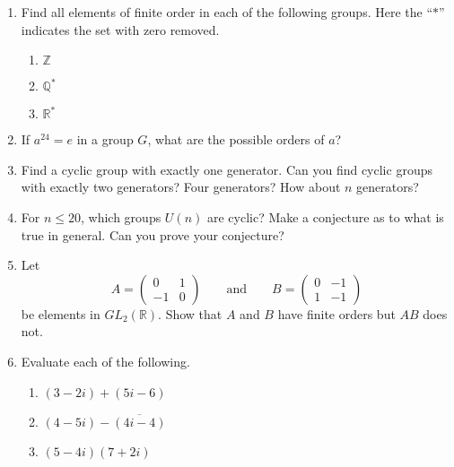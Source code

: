 {\begin{enumerate}
\item
Find all elements of finite order in each of the following groups. Here the ``$\ast$'' indicates the set with zero removed.
\begin{multicols}{3}
\begin{enumerate}
 
 \item
${\mathbb Z}$
 
 \item
${\mathbb Q}^\ast$
 
 \item
${\mathbb R}^\ast$
 
\end{enumerate}
 \end{multicols}
 
\item
If $a^{24} =e$ in a group $G$, what are the possible orders of $a$? 
 
 
\item
Find a cyclic group with exactly one generator.  Can you find cyclic
groups with exactly two generators?  Four generators?  How about $n$
generators?
 
 
\item
For $n \leq 20$, which groups $U(n)$ are cyclic?  Make a conjecture as
to what is true in general.  Can you prove your conjecture?  
 
 
\item
Let
\[
A=
\begin{pmatrix}
0 & 1 \\
-1 & 0
\end{pmatrix}
\qquad \text{and} \qquad
B=
\begin{pmatrix}
0 & -1 \\
1 & -1
\end{pmatrix}
\]
be elements in $GL_2( {\mathbb R} )$. Show that $A$ and $B$ have finite
orders but $AB$ does not. 
 
 
\item
Evaluate each of the following.
\begin{multicols}{2}
\begin{enumerate}
 
\item
$(3-2i)+ (5i-6)$

 
\item
 $(4-5i)-\overline{(4i -4)}$
 
 \item
$(5-4i)(7+2i)$
 

\end{enumerate}
\end{multicols}
\end{enumerate}}
